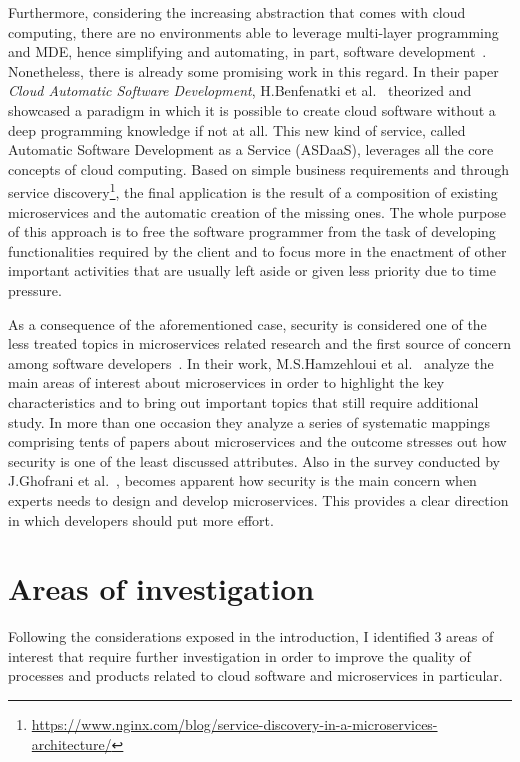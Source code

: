 \documentclass[a4paper, 10pt, conference]{ieeeconf}
\begin{document}
Furthermore, considering the increasing abstraction that comes with cloud computing, there are no environments able to leverage multi-layer programming and MDE, hence simplifying and automating, in part, software development~\cite{overview-platforms}. Nonetheless, there is already some promising work in this regard. In their paper \textit{Cloud Automatic Software Development}, H.Benfenatki et al.~\cite{automatic-dev} theorized and showcased a paradigm in which it is possible to create cloud software without a deep programming knowledge if not at all. This new kind of service, called Automatic Software Development as a Service (ASDaaS), leverages all the core concepts of cloud computing. Based on simple business requirements and through service discovery\footnote{\url{https://www.nginx.com/blog/service-discovery-in-a-microservices-architecture/}}, the final application is the result of a composition of existing microservices and the automatic creation of the missing ones. The whole purpose of this approach is to free the software programmer from the task of developing functionalities required by the client and to focus more in the enactment of other important activities that are usually left aside or given less priority due to time pressure.

As a consequence of the aforementioned case, security is considered one of the less treated topics in microservices related research and the first source of concern among software developers~\cite{research-mss, challenges-mss}. In their work, M.S.Hamzehloui et al.~\cite{research-mss} analyze the main areas of interest about microservices in order to highlight the key characteristics and to bring out important topics that still require additional study. In more than one occasion they analyze a series of systematic mappings comprising tents of papers about microservices and the outcome stresses out how security is one of the least discussed attributes. Also in the survey conducted by J.Ghofrani et al.~\cite{challenges-mss}, becomes apparent how security is the main concern when experts needs to design and develop microservices. This provides a clear direction in which developers should put more effort.

\section{Areas of investigation}

Following the considerations exposed in the introduction, I identified 3 areas of interest that require further investigation in order to improve the quality of processes and products related to cloud software and microservices in particular. 
\end{document}
